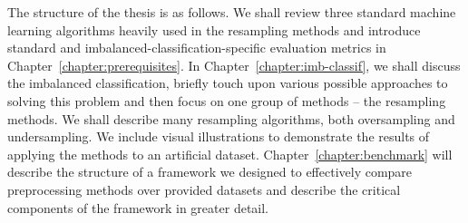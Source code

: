 The structure of the thesis is as follows. We shall review three standard machine learning
algorithms heavily used in the resampling methods and introduce standard and
imbalanced-classification-specific evaluation metrics in Chapter~\ref{chapter:prerequisites}. In
Chapter~\ref{chapter:imb-classif}, we shall discuss the imbalanced classification, briefly touch
upon various possible approaches to solving this problem and then focus on one group of methods –
the resampling methods. We shall describe many resampling algorithms, both oversampling and
undersampling. We include visual illustrations to demonstrate the results of applying the methods
to an artificial dataset. Chapter~\ref{chapter:benchmark} will describe the structure of a
framework we designed to effectively compare preprocessing methods over provided datasets and
describe the critical components of the framework in greater detail. 


